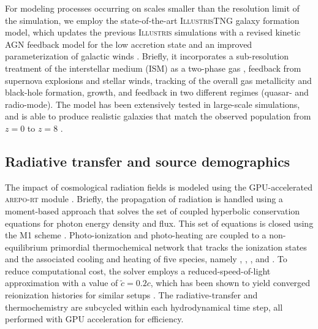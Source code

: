\documentclass[apj,twocolumn, appendixfloats, twocolappendix, numberedappendix, tighten]{openjournal}
\DeclareRobustCommand{\lumina}{\mbox{\textsc{lumina}}\xspace}
\begin{document}
For modeling processes occurring on scales smaller than the resolution limit of the simulation, we employ the state-of-the-art \textsc{IllustrisTNG} galaxy formation model, which updates the previous \textsc{Illustris} simulations \citep[][]{Vogelsberger2014} with a revised kinetic AGN feedback model for the low accretion state \citep[][]{Weinberger2017} and an improved parameterization of galactic winds \citep[][]{Pillepich2018a}. Briefly, it incorporates a sub-resolution treatment of the interstellar medium (ISM) as a two-phase gas  \citep[][]{Springel2003}, feedback from supernova explosions and stellar winds, tracking of the overall gas metallicity and black-hole formation, growth, and feedback in two different regimes (quasar- and radio-mode). The model has been extensively tested in large-scale simulations, and is able to produce realistic galaxies that match the observed population from $z=0$ to $z=8$ \citep[][]{Springel2018, Nelson2018, Pillepich2018b, Kannan2023, Pakmor2023}.


\subsection{Radiative transfer and source demographics} \label{sec:rt}

The impact of cosmological radiation fields is modeled using the GPU-accelerated \textsc{arepo-rt} module \citep[][]{Kannan2019, Zier2024}. Briefly, the propagation of radiation is handled using a moment-based approach that solves the set of coupled hyperbolic conservation equations for photon energy density and flux. This set of equations is closed using the M1 scheme \citep[][]{Levermore1984, Dubroca1999}. Photo-ionization and photo-heating are coupled to a non-equilibrium primordial thermochemical network that tracks the ionization states and the associated cooling and heating of five species, namely , , ,  and .   To reduce computational cost, the solver employs a reduced-speed-of-light approximation \citep[][]{Gnedin2001} with a value of $\tilde{c} = 0.2 c$, which has been shown to yield converged reionization histories for similar setups \citep[][]{Kannan2022}. The radiative-transfer and thermochemistry are subcycled within each hydrodynamical time step, all performed with GPU acceleration for efficiency.

\end{document}
